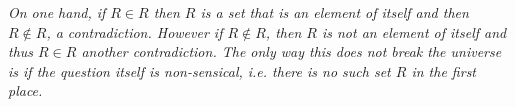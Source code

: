 \documentclass[11pt]{preprint}
\begin{document}
\begin{enumerate}
\vspace{0.2cm}
\textit{On one hand, if $R\in R$ then $R$ is a set that is an element of itself and then $R\notin R$, a contradiction. However if $R\notin R$, then $R$ is not an element of itself and thus $R\in R$ another contradiction. The only way this does not break the universe is if the question itself is non-sensical, i.e. there is no such set $R$ in the first place.}
\vspace{0.2cm}

\end{enumerate}
\end{document}
